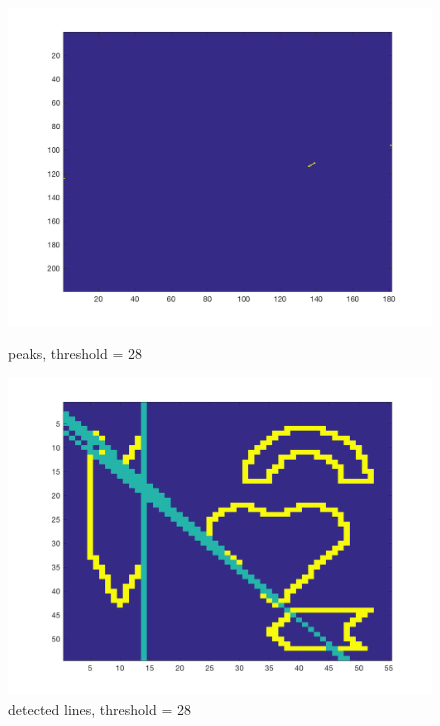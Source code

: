 \documentclass[paper=a4, fontsize=11pt]{scrartcl} %
\numberwithin{equation}{section} %
\numberwithin{figure}{section} %
\numberwithin{table}{section} %
\begin{document}
\begin{figure}[H]
  \centering
  \begin{minipage}[b]{0.49\textwidth}
    \includegraphics[width=\textwidth]{peaks_threshold_28.png}
    \caption{peaks, threshold = 28}
  \end{minipage}
  \hfill
  \begin{minipage}[b]{0.49\textwidth}
    \includegraphics[width=\textwidth]{edgeDetection_threshold_28.png}
    \caption{detected lines, threshold = 28}
  \end{minipage}
\end{figure}
\end{document}
